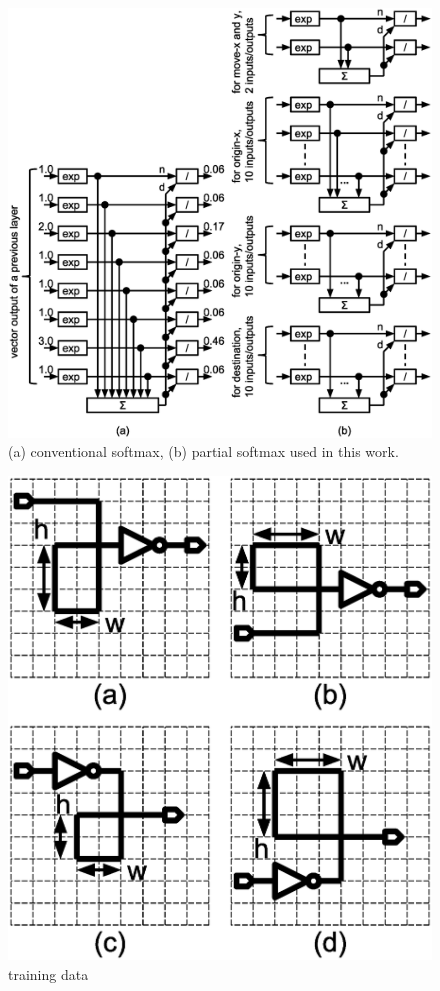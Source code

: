 \documentclass[twocolumn]{article}
\begin{document}
\begin{figure}[!tp]
 \begin{center}
  \begin{minipage}{\hsize}
   \includegraphics[width=\hsize]{fig/partial_softmax_05.eps}
   \caption{(a) conventional softmax, (b) partial softmax used in this work.}
   \label{fig:partial_softmax}
  \end{minipage}
 \end{center}
\end{figure}

\begin{figure}[!tp]
  \begin{minipage}{\hsize}
 \begin{center}
   \includegraphics[width=0.7\hsize]{fig/training_data_02.eps}
   \caption{training data}
   \label{fig:training_data}
 \end{center}
  \end{minipage}
\end{figure}
\end{document}
